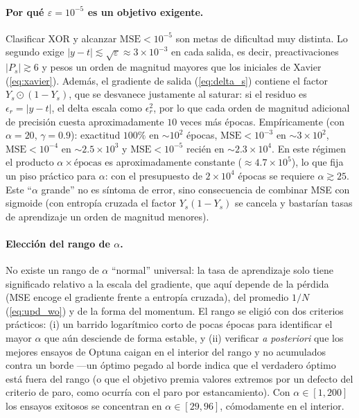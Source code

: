 \documentclass[11pt,a4paper]{article}
\begin{document}
\paragraph{Por qué $\varepsilon=10^{-5}$ es un objetivo exigente.}
Clasificar XOR y alcanzar $\text{MSE}<10^{-5}$ son metas de dificultad muy
distinta. Lo segundo exige $|y-t|\lesssim\sqrt{\varepsilon}\approx 3\times
10^{-3}$ en cada salida, es decir, preactivaciones $|P_s|\gtrsim 6$ y pesos un
orden de magnitud mayores que los iniciales de Xavier (\cref{eq:xavier}).
Además, el gradiente de salida (\cref{eq:delta_s}) contiene el factor
$Y_s\odot(1-Y_s)$, que se desvanece justamente al saturar: si el residuo es
$\epsilon_r=|y-t|$, el delta escala como $\epsilon_r^2$, por lo que cada orden
de magnitud adicional de precisión cuesta aproximadamente $10$ veces más
épocas. Empíricamente (con $\alpha=20$, $\gamma=0.9$): exactitud $100\%$ en
$\sim 10^2$ épocas, $\text{MSE}<10^{-3}$ en $\sim 3\times 10^2$,
$\text{MSE}<10^{-4}$ en $\sim 2.5\times 10^3$ y $\text{MSE}<10^{-5}$ recién en
$\sim 2.3\times 10^4$. En este régimen el producto
$\alpha\times\text{épocas}$ es aproximadamente constante
($\approx 4.7\times 10^5$), lo que fija un piso práctico para $\alpha$: con el
presupuesto de $2\times 10^4$ épocas se requiere $\alpha\gtrsim 25$. Este
``$\alpha$ grande'' no es síntoma de error, sino consecuencia de combinar MSE
con sigmoide (con entropía cruzada el factor $Y_s(1-Y_s)$ se cancela y
bastarían tasas de aprendizaje un orden de magnitud menores).

\paragraph{Elección del rango de $\alpha$.}
No existe un rango de $\alpha$ ``normal'' universal: la tasa de aprendizaje
solo tiene significado relativo a la escala del gradiente, que aquí depende de
la pérdida (MSE encoge el gradiente frente a entropía cruzada), del promedio
$1/N$ (\cref{eq:upd_wo}) y de la forma del momentum. El rango se eligió con dos
criterios prácticos: (i) un barrido logarítmico corto de pocas épocas para
identificar el mayor $\alpha$ que aún desciende de forma estable, y (ii)
verificar \emph{a posteriori} que los mejores ensayos de Optuna caigan en el
interior del rango y no acumulados contra un borde —un óptimo pegado al borde
indica que el verdadero óptimo está fuera del rango (o que el objetivo premia
valores extremos por un defecto del criterio de paro, como ocurría con el paro
por estancamiento). Con $\alpha\in[1,200]$ los ensayos exitosos se concentran
en $\alpha\in[29,96]$, cómodamente en el interior.
\end{document}
